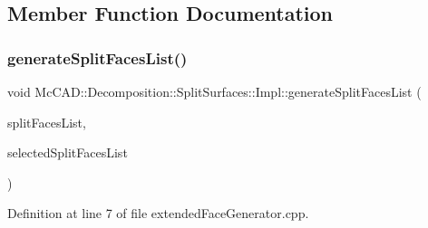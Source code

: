 \subsection{Member Function Documentation}
\mbox{\label{classMcCAD_1_1Decomposition_1_1SplitSurfaces_1_1Impl_a4430db732d0f33db4b1aaa1ef38fbe76}} 
\subsubsection{\texorpdfstring{generate\+Split\+Faces\+List()}{generateSplitFacesList()}\hspace{0.1cm}{\footnotesize\ttfamily [1/2]}}
{\footnotesize\ttfamily void Mc\+C\+A\+D\+::\+Decomposition\+::\+Split\+Surfaces\+::\+Impl\+::generate\+Split\+Faces\+List (\begin{DoxyParamCaption}\item[{std\+::vector$<$ std\+::shared\+\_\+ptr$<$ \hyperlink{classMcCAD_1_1Geometry_1_1BoundSurface}{Geometry\+::\+Bound\+Surface} $>$$>$ \&}]{split\+Faces\+List,  }\item[{std\+::vector$<$ std\+::shared\+\_\+ptr$<$ \hyperlink{classMcCAD_1_1Geometry_1_1BoundSurface}{Geometry\+::\+Bound\+Surface} $>$$>$ \&}]{selected\+Split\+Faces\+List }\end{DoxyParamCaption})\hspace{0.3cm}{\ttfamily [static]}}



Definition at line 7 of file extended\+Face\+Generator.\+cpp.


